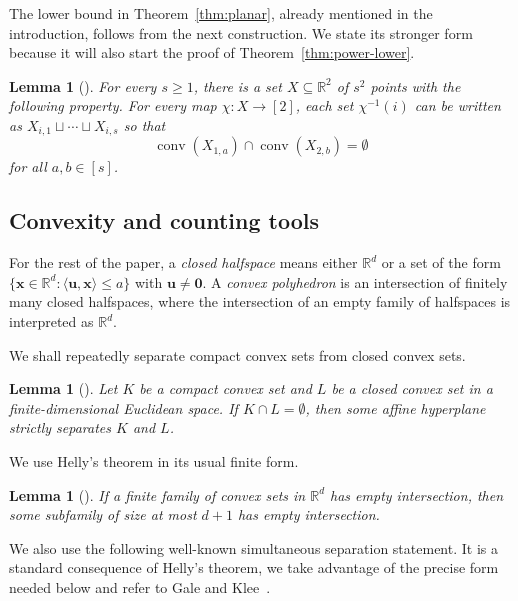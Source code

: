\documentclass[11pt]{article}
\newtheorem{lemma}[theorem]{Lemma}
\theoremstyle{definition}
\newcommand{\R}{\mathbb{R}}
\newcommand{\conv}{\operatorname{conv}}
\begin{document}
The lower bound in Theorem~\ref{thm:planar}, already mentioned in the introduction, follows from the next construction. We state its stronger form because it will also start the proof of Theorem~\ref{thm:power-lower}.

\begin{lemma}[\cite{ChenGeShuWangXu2025}]\label{lem:planar-bad-set}
For every \(s\ge1\), there is a set \(X\subseteq\R^{2}\) of \(s^{2}\) points with the following property. For every map \(\chi:X\to[2]\), each set \(\chi^{-1}(i)\) can be written as \(X_{i,1}\sqcup\cdots\sqcup X_{i,s}\) so that
\[
\conv(X_{1,a})\cap\conv(X_{2,b})=\emptyset
\]
for all \(a,b\in[s]\).
\end{lemma}

\subsection{Convexity and counting tools}

For the rest of the paper, a \emph{closed halfspace} means either \(\R^{d}\) or a set of the form \(\{\boldsymbol{x}\in\R^{d}:\langle\boldsymbol{u},\boldsymbol{x}\rangle\le a\}\) with \(\boldsymbol{u}\ne\boldsymbol{0}\). A \emph{convex polyhedron} is an intersection of finitely many closed halfspaces, where the intersection of an empty family of halfspaces is interpreted as \(\R^{d}\).

We shall repeatedly separate compact convex sets from closed convex sets.

\begin{lemma}[\cite{Rockafellar1970}]\label{lem:strict-separation}
Let \(K\) be a compact convex set and \(L\) be a closed convex set in a finite-dimensional Euclidean space. If \(K\cap L=\emptyset\), then some affine hyperplane strictly separates \(K\) and \(L\).
\end{lemma}

We use Helly's theorem in its usual finite form.

\begin{lemma}[\cite{Helly1923}]\label{lem:helly}
If a finite family of convex sets in \(\R^{d}\) has empty intersection, then some subfamily of size at most \(d+1\) has empty intersection.
\end{lemma}

We also use the following well-known simultaneous separation statement. It is a standard consequence of Helly's theorem, we take advantage of the precise form needed below and refer to Gale and Klee~\cite{GaleKlee1959}.
\end{document}
